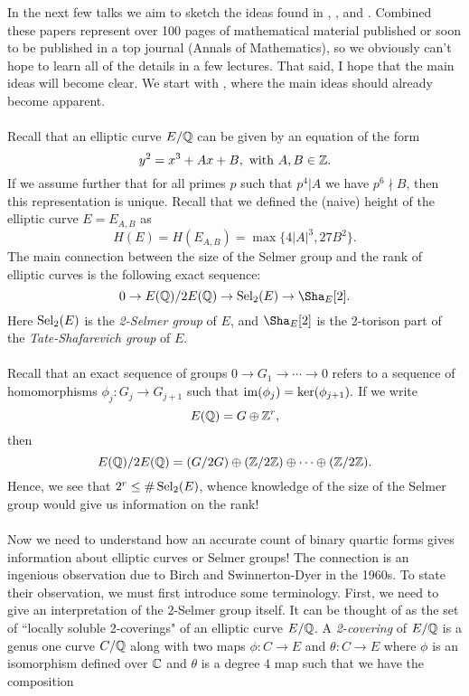 \documentclass[12pt,amsfont]{amsart}
\begin{document}
In the next few talks we aim to sketch the ideas found in \cite{BS1}, \cite{BS2}, and \cite{BS3}. Combined these papers represent over 100 pages of mathematical material published or soon to be published in a top journal (Annals of Mathematics), so we obviously can't hope to learn all of the details in a few lectures. That said, I hope that the main ideas will become clear. We start with \cite{BS1}, where the main ideas should already become apparent. \\ \\
Recall that an elliptic curve $E/{\mathbb Q}$ can be given by an equation of the form
\[y^2 = x^3 + Ax + B, \text{ with } A, B \in {\mathbb Z}.\]
If we assume further that for all primes $p$ such that $p^4 | A$ we have $p^6 \nmid B$, then this representation is unique. Recall that we defined the (naive) height of the elliptic curve $E = E_{A,B}$ as
\[H(E) = H(E_{A,B}) = \max\{4|A|^3, 27B^2\}. \]
The main connection between the size of the Selmer group and the rank of elliptic curves is the following exact sequence:
\[0 \rightarrow E(\bQ)/2 E(\bQ) \rightarrow \Sel_2(E) \rightarrow \Sha_E[2]. \]
Here $\operatorname{Sel}_2(E)$ is the \emph{2-Selmer group} of $E$, and $\Sha_E[2]$ is the 2-torison part of the \emph{Tate-Shafarevich group} of $E$. \\ \\
Recall that an exact sequence of groups $0 \rightarrow G_1 \rightarrow \cdots \rightarrow 0 $ refers to a sequence of homomorphisms $\phi_j : G_j \rightarrow G_{j+1}$ such that $\operatorname{im}(\phi_j) = \ker(\phi_{j+1}).$ If we write
\[E({\mathbb Q}) = G \oplus {\mathbb Z}^r,\]
then
\[E({\mathbb Q})/2 E({\mathbb Q}) = (G/2G) \oplus ({\mathbb Z}/2{\mathbb Z}) \oplus \cdots \oplus ({\mathbb Z}/2 {\mathbb Z}).\]
Hence, we see that $2^r \leq \# \operatorname{Sel}_2(E)$, whence knowledge of the size of the Selmer group would give us information on the rank! \\ \\
Now we need to understand how an accurate count of binary quartic forms gives information about elliptic curves or Selmer groups! The connection is an ingenious observation due to Birch and Swinnerton-Dyer in the 1960s. To state their observation, we must first introduce some terminology. First, we need to give an interpretation of the 2-Selmer group itself. It can be thought of as the set of ``locally soluble 2-coverings" of an elliptic curve $E/{\mathbb Q}$. A \emph{2-covering} of $E/{\mathbb Q}$ is a genus one curve $C/{\mathbb Q}$ along with two maps $\phi: C \rightarrow E$ and $\theta: C \rightarrow E$ where $\phi$ is an isomorphism defined over ${\mathbb C}$ and $\theta$ is a degree $4$ map such that we have the composition
\end{document}
